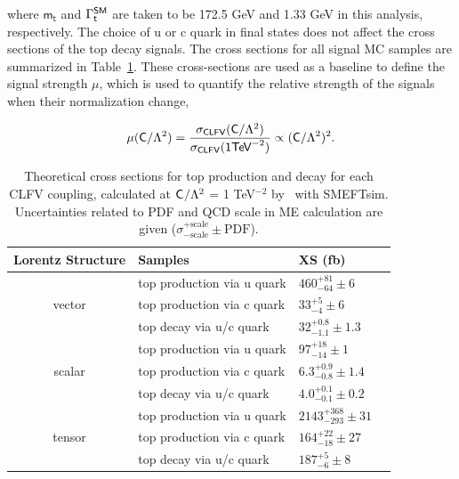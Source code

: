 where $\textsf{m}_{\textsf{t}}$ and $\mathrm{\Gamma}_{\textsf{t}}^{\textsf{SM}}$ are taken to be 172.5 GeV and 1.33 GeV in this analysis, respectively. The choice of u or c quark in final states does not affect the cross sections of the top decay signals. The cross sections for all signal \ac{MC} samples are summarized in Table~\ref{tab:signal}. These cross-sections are used as a baseline to define the signal strength $\mu$, which is used to quantify the relative strength of the signals when their normalization change,

\begin{equation}
\mu(\textsf{C}/\mathrm{\Lambda}^2)=\frac{\sigma_{\textsf{CLFV}}(\textsf{C}/\mathrm{\Lambda}^2)}{\sigma_{\textsf{CLFV}}(\textsf{1}\textsf{TeV}^{-2})}\propto(\textsf{C}/\mathrm{\Lambda}^2)^2.
\label{eq:signal_strength}
\end{equation}

\begin{table}[th]
\sffamily
\centering
\caption{Theoretical cross sections for top production and decay for each \ac{CLFV} coupling, calculated at $\textsf{C}^{}_{}/\mathrm{\Lambda}^2$ = 1 TeV$^{-2}$ by \MG~with SMEFTsim. Uncertainties related to \ac{PDF} and \ac{QCD} scale in \ac{ME} calculation are given ($\sigma^{+\text{scale}}_{-\text{scale}}\pm \text{PDF}$).}
\begin{tabular}{clll}
\toprule 
Lorentz Structure  & Samples       & XS (fb)  \\ \midrule
\multirow{3}{*}{vector} & top production via u quark & $460^{+81}_{-64}\pm6$ \\ 
   & top production via c quark & $33^{+5}_{-4}\pm6$  \\
   & top decay via u/c quark    & $32^{+0.8}_{-1.1}\pm1.3$  \\ \midrule
\multirow{3}{*}{scalar} &top production via u quark & $97^{+18}_{-14}\pm1$ \\ 
   & top production via c quark    & $6.3^{+0.9}_{-0.8}\pm1.4$ \\
   & top decay via u/c quark  & $4.0^{+0.1}_{-0.1}\pm0.2$ \\ \midrule 
\multirow{3}{*}{tensor} & top production via u quark & $2143^{+368}_{-293}\pm31$ \\
   & top production via c quark & $164^{+22}_{-18}\pm27$  \\
   & top decay via u/c quark   & $187^{+5}_{-6}\pm8$  \\ \bottomrule
\end{tabular}
\vspace{-0.5em}
\label{tab:signal}
\end{table}

